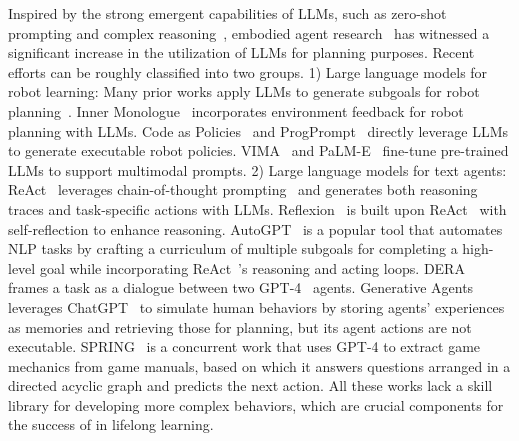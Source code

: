 Inspired by the strong emergent capabilities of LLMs, such as zero-shot prompting and complex reasoning~\cite{bommasani2021opportunities,brown2020gpt3,raffel2020t5,wei2022emergent,chowdhery2022palm,chung2022flan}, embodied agent research~\cite{duan2022survey, batra2020rearrangement, ravichandar2020recent, collins2021review} has witnessed a significant increase in the utilization of LLMs for planning purposes.
Recent efforts can be roughly classified into two groups.
1) Large language models for robot learning:
Many prior works apply LLMs to generate subgoals for robot planning~\cite{huang2022language,huang2022language,ahn2022saycan,min2021film,blukis2021a}. 
Inner Monologue~\citep{huang2022inner} incorporates environment feedback for robot planning with LLMs.
Code as Policies~\cite{liang2022code} and ProgPrompt~\cite{singh2022progprompt} directly leverage LLMs to generate executable robot policies. 
VIMA~\cite{jiang2022vima} and PaLM-E~\cite{driess2023palme} fine-tune pre-trained LLMs to support multimodal prompts.
2) Large language models for text agents:
ReAct~\cite{yao2022react} leverages chain-of-thought prompting~\cite{wei2022chain} and generates both reasoning traces and task-specific actions with LLMs. 
Reflexion~\cite{shinn2023reflexion} is built upon ReAct~\cite{yao2022react} with self-reflection to enhance reasoning. 
AutoGPT~\cite{autogpt} is a popular tool that automates NLP tasks by crafting a curriculum of multiple subgoals for completing a high-level goal while incorporating ReAct~\cite{yao2022react}'s reasoning and acting loops. 
DERA~\cite{nair2023dera} frames a task as a dialogue between two GPT-4~\cite{openai2023gpt4} agents. 
Generative Agents~\cite{park2023generative} leverages ChatGPT~\cite{chatgpt} to simulate human behaviors by storing agents' experiences as memories and retrieving those for planning, but its agent actions are not executable. SPRING~\cite{wu2023spring} is a concurrent work that uses GPT-4 to extract game mechanics from game manuals, based on which it answers questions arranged in a directed acyclic graph and predicts the next action.
All these works lack a skill library for developing more complex behaviors, which are crucial components for the success of \voyager in lifelong learning. 


